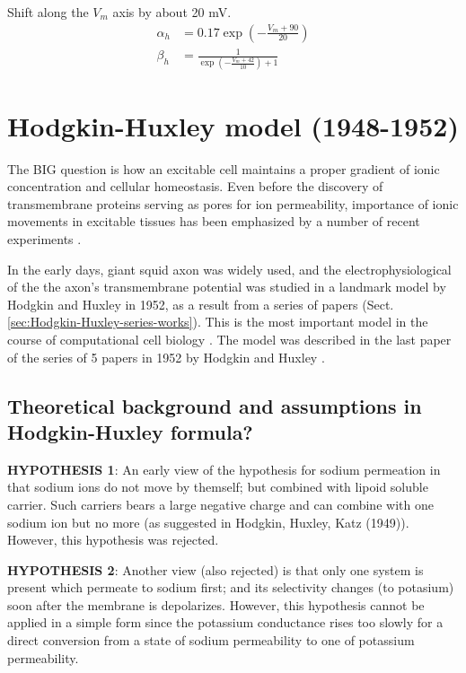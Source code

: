 Shift along the $V_m$ axis by about 20 mV. 
\begin{equation}
  \label{eq:358_copy}
  \begin{split}
    \alpha_h &= 0.17 \exp (-\frac{V_m+90}{20})  \\
    \beta_h &= \frac{1}{\exp(-\frac{V_m+42}{10}) + 1}
  \end{split}
\end{equation}










\section{Hodgkin-Huxley model (1948-1952)}
\label{sec:Hodgkin-Huxley-1952-model}


The BIG question is how an excitable cell maintains a proper gradient of ionic
concentration and cellular homeostasis.  Even before the discovery of
transmembrane proteins serving as pores for ion permeability,  importance of
ionic movements in excitable tissues has been emphasized by a number of recent
experiments \citep{hodgkin1952mcv}.

In the early days, giant squid axon was widely used, and the
electrophysiological of the the axon's transmembrane potential was studied in a
landmark model by Hodgkin and Huxley in 1952, as a result from a series of
papers (Sect.\ref{sec:Hodgkin-Huxley-series-works}). This is the most important
model in the course of computational cell biology \citep{hodgkin1952ap}. The
model was described in the last paper of the series of 5 papers in 1952 by
Hodgkin and Huxley .


\subsection{Theoretical background and assumptions in Hodgkin-Huxley
formula?}
\label{sec:Hodgkin-Huxley-hypothesis}

{\bf HYPOTHESIS 1}:  An early view of the hypothesis for sodium permeation in
that sodium ions do not move by themself; but combined with lipoid soluble
carrier. Such carriers bears a large negative charge and can combine with one
sodium ion but no more (as suggested in Hodgkin, Huxley, Katz (1949)). However,
this hypothesis was rejected.

{\bf HYPOTHESIS 2}:  Another view (also rejected) is that only one system is
present which permeate to sodium first; and its selectivity changes (to potasium) soon after the
membrane is depolarizes. However, this hypothesis cannot be applied in a simple
form since the potassium conductance rises too slowly for a direct conversion
from a state of sodium permeability to one of potassium permeability.

